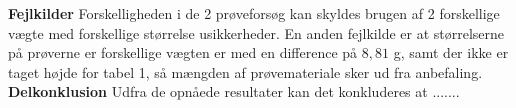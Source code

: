 \textbf{Fejlkilder}
\newline
Forskelligheden i de 2 prøveforsøg kan skyldes brugen af 2 forskellige vægte med forskellige størrelse usikkerheder. En anden fejlkilde er at størrelserne på prøverne er forskellige vægten er med en difference på $8,\!81$ g, samt der ikke er taget højde for tabel 1, så mængden af prøvemateriale sker ud fra anbefaling.
\newline
\newline
\textbf{Delkonklusion}
\newline
Udfra de opnåede resultater kan det konkluderes at .......